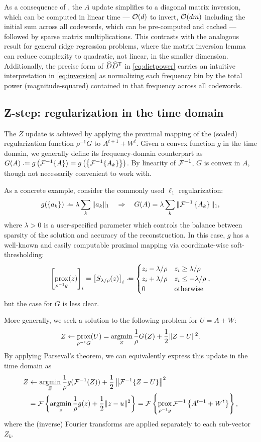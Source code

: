 \documentclass{article} %
\begin{document}
As a consequence of , the $A$ update simplifies to a diagonal matrix
inversion, which can be computed in linear time --- $\mathcal{O}(d)$ to invert, $\mathcal{O}(dm)$
including the initial sum across all codewords, which can be pre-computed and 
cached --- followed by sparse matrix multiplications.
This contrasts with the analogous result for general ridge regression problems, where the 
matrix inversion lemma can reduce complexity to quadratic, not linear, in the smaller 
dimension. 
Additionally, the precise form of $\widehat{D}\widehat{D}^\mathsf{T}$ in \eqref{eq:dictpower} 
carries an intuitive interpretation in \eqref{eq:inversion} as normalizing each frequency 
bin by the total power (magnitude-squared) contained in that frequency across all 
codewords.


\subsection{Z-step: regularization in the time domain}
\label{sec:zstep}
The $Z$ update is achieved by applying the proximal mapping of the (scaled) 
regularization function $\rho^{-1}G$ to $A^{t+1} + W^t$.  
Given a convex function $g$ in the time domain, we generally define its
frequency-domain counterpart as 
$G(A) \defeq g\left(\F^{-1}\{A\}\right) = g\left(\left\{\F^{-1}\{A_k\}\right\}\right)$.  By linearity of
$\mathcal{F}^{-1}$, $G$ is convex in $A$, though not necessarily convenient to work with.

As a concrete example, consider the commonly used $\ell_1$ regularization:
\[
g(\{a_k\}) \defeq \lambda \sum_k \|a_k\|_1
\quad \Rightarrow \quad
G(A) = \lambda \sum_k \| \F^{-1} \left\{ A_k \right\} \|_1,
\]
where $\lambda>0$ is a user-specified parameter which controls the balance between
sparsity of the solution and accuracy of the reconstruction.  In this case, $g$ has a
well-known and easily computable proximal mapping via coordinate-wise soft-thresholding:
\[
{\left[\prox_{\rho^{-1} g}(z)\right]}_i = {\left[S_{\lambda/\rho}(z)\right]}_i \defeq \begin{cases}
z_i - \lambda / \rho & z_i \geq \lambda / \rho\\
z_i + \lambda / \rho & z_i \leq -\lambda / \rho\\
0 & \text{otherwise}
\end{cases},
\]
but the case for $G$ is less clear.

More generally, we seek a solution to the following problem for $U = A + W$:
\[
Z \leftarrow \operatorname*{prox}_{\rho^{-1}G}(U) = \operatorname*{argmin}_Z \frac{1}{\rho}G(Z) + \frac{1}{2} \| Z - U\|^2.
\]
By applying Parseval's theorem, we can equivalently express this update in the time
domain as
\begin{align}
Z &\leftarrow \operatorname*{argmin}_Z \frac{1}{\rho} g(\mathcal{F}^{-1}(Z)) + \frac{1}{2}\left\|\mathcal{F}^{-1}\{Z -
U\}\right\|^2\notag\\
&= \mathcal{F}\left\{\operatorname*{argmin}_z \frac{1}{\rho} g(z) + \frac{1}{2} \|z - u\|^2
\right\}
=\mathcal{F}\left\{ \operatorname*{prox}_{\rho^{-1}g} \mathcal{F}^{-1}\left\{A^{t+1} + W^t
\right\} \right\},\label{eq:timeprox}
\end{align}
where the (inverse) Fourier transforms are applied separately to each sub-vector $Z_k$.  
\end{document}
